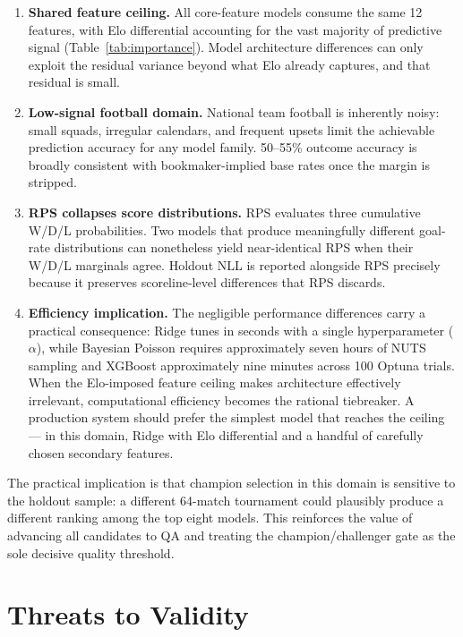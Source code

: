 \documentclass[conference]{IEEEtran}
\begin{document}
\begin{enumerate}
  \item \textbf{Shared feature ceiling.} All core-feature models consume the
  same 12 features, with Elo differential accounting for the vast majority of
  predictive signal (Table~\ref{tab:importance}).  Model architecture
  differences can only exploit the residual variance beyond what Elo already
  captures, and that residual is small.

  \item \textbf{Low-signal football domain.} National team football is
  inherently noisy: small squads, irregular calendars, and frequent upsets
  limit the achievable prediction accuracy for any model family.  50--55\%
  outcome accuracy is broadly consistent with bookmaker-implied base rates
  once the margin is stripped.

  \item \textbf{RPS collapses score distributions.} RPS evaluates three
  cumulative W/D/L probabilities.  Two models that produce meaningfully
  different goal-rate distributions can nonetheless yield near-identical RPS
  when their W/D/L marginals agree.  Holdout NLL is reported alongside RPS
  precisely because it preserves scoreline-level differences that RPS
  discards.

  \item \textbf{Efficiency implication.} The negligible performance
  differences carry a practical consequence: Ridge tunes in seconds with a
  single hyperparameter ($\alpha$), while Bayesian Poisson requires
  approximately seven hours of NUTS sampling and XGBoost approximately nine
  minutes across 100 Optuna trials.  When the Elo-imposed feature ceiling
  makes architecture effectively irrelevant, computational efficiency becomes
  the rational tiebreaker.  A production system should prefer the simplest
  model that reaches the ceiling --- in this domain, Ridge with Elo
  differential and a handful of carefully chosen secondary features.
\end{enumerate}

The practical implication is that champion selection in this domain is
sensitive to the holdout sample: a different 64-match tournament could
plausibly produce a different ranking among the top eight models.  This
reinforces the value of advancing all candidates to QA and treating the
champion/challenger gate as the sole decisive quality threshold.

\section{Threats to Validity}
\label{sec:threats}
\end{document}
